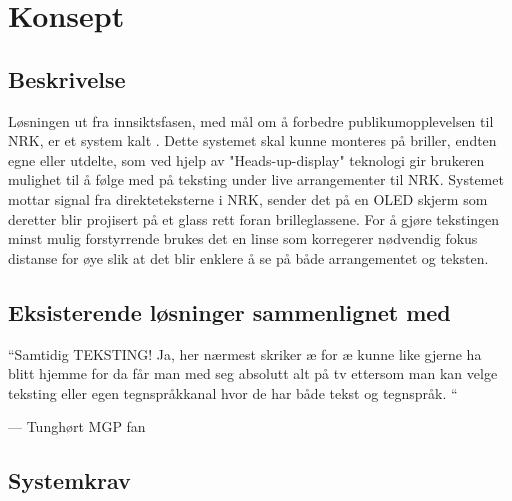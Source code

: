 
\section{Konsept}
\label{sec:konsept}
\subsection{Beskrivelse}

Løsningen ut fra innsiktsfasen, med mål om å forbedre publikumopplevelsen til NRK,
er et system kalt \Projectname. Dette systemet skal kunne monteres på briller, endten egne eller utdelte, som ved hjelp av "Heads-up-display" teknologi gir brukeren mulighet til å følge med på teksting under live arrangementer til NRK. Systemet mottar signal fra direkteteksterne i NRK, sender det på en OLED skjerm som deretter blir projisert på et glass rett foran brilleglassene. For å gjøre tekstingen minst mulig forstyrrende brukes det en linse som korregerer nødvendig fokus distanse for øye slik at det blir enklere å se på både arrangementet og teksten. 
\subsection{Eksisterende løsninger sammenlignet med \Projectname}

\epigraphfontsize{\small\itshape}
\setlength\epigraphwidth{8cm}
\setlength\epigraphrule{0pt}
\epigraphfontsize{\small\itshape}
\label{quote:1}
\epigraph{“Samtidig TEKSTING! Ja, her nærmest skriker æ for æ kunne like gjerne ha blitt hjemme for da får man med seg absolutt alt på tv ettersom man kan velge teksting eller egen tegnspråkkanal hvor de har både tekst og tegnspråk. “}{--- \textup{Tunghørt MGP fan}}


\subsection{Systemkrav}

